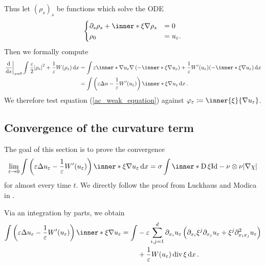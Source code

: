 Thus let $ ( \rho_{ s } )_{ s } $ be functions which solve the ODE
\[
	\begin{cases}
	\partial_{ s } \rho_{ s } 
	+
	\inner*{ \xi }{ \nabla \rho_{ s } }
	& = 0
	\\
	\rho_{ 0 } & = u_{ \varepsilon }.
	\end{cases}
\]
Then we formally compute 
\begin{align*}
	\left.\dv{ s }\right|_{ s = 0 }
		\int
			\frac{ \varepsilon }{ 2 }
			\abs{ \rho_{ s } }^{ 2 }
			+
			\frac{ 1 }{ \varepsilon }
			W ( \rho_{ s } )
		\dd{ x }
	& =
	\int
		\varepsilon 
		\inner*{ \nabla u_{ \varepsilon } }
		{ \nabla \left( - \inner*{ \xi }{ \nabla u_{ \varepsilon } } \right) }
		+
		\frac{ 1 }{ \varepsilon }
		W'( u_{ \varepsilon } ) ( -\inner*{ \xi }{ \nabla u_{ \varepsilon } } )
	\dd{ x }
	\\
	& =
	\int
		\left(
			\varepsilon \Delta u - \frac{ 1 }{ \varepsilon } W'( u_{ \varepsilon } )
		\right)
		\inner*{ \xi }{ \nabla u_{ \varepsilon } } 
	\dd{ x }.
\end{align*}
We therefore test equation (\ref{ac_weak_equation}) against $ \varphi_{ \varepsilon } \coloneqq \inner{ \xi }{ \nabla u_{ \varepsilon } } $.

\subsection{Convergence of the curvature term}

The goal of this section is to prove the convergence
\begin{equation*}
	\lim_{ \varepsilon \to 0 }
		\int
			\left(
				\varepsilon \Delta u_{ \varepsilon }
				- 
				\frac{ 1 }{ \varepsilon }
				W'( u_{ \varepsilon } )
			\right)
			\inner*{ \xi }{ \nabla u_{ \varepsilon } }
		\dd{ x }
	=
	\sigma
	\int
		\inner*{ \diff \xi }{ \mathrm{Id} - \nu \otimes \nu }
	\abs{ \nabla \chi }
\end{equation*} 
for almost every time $ t $. We directly follow the proof from Luckhaus and Modica in \cite{luckhaus_modica_gibbs_thompson_relation}.

Via an integration by parts, we obtain
\begin{align}
	\label{conv_of_curv_first_ibp_scalar}
	\int
		\left(
			\varepsilon \Delta u_{ \varepsilon }
			-
			\frac{ 1 }{ \varepsilon } W'(u_{ \varepsilon } ) 
		\right)
		\inner*{ \xi }{ \nabla u_{ \varepsilon } }
	= 
	\int
		& - \varepsilon 
		\sum_{ i, j = 1 }^{ d }
			\partial_{ x_{ i } } u_{ \varepsilon }
			\left(
				\partial_{ x_{ i } } \xi^{ j }
				\partial_{ x_{ j } } u_{ \varepsilon }
				+
				\xi^{ j }
				\partial_{ x_{ i } x_{ j } }^{ 2 } u_{ \varepsilon }
			\right)
	\notag
	\\
	& +
		\frac{ 1 }{ \varepsilon }
		W ( u_{ \varepsilon } )
		\divg \xi 
	\dd{ x }.
\end{align}

